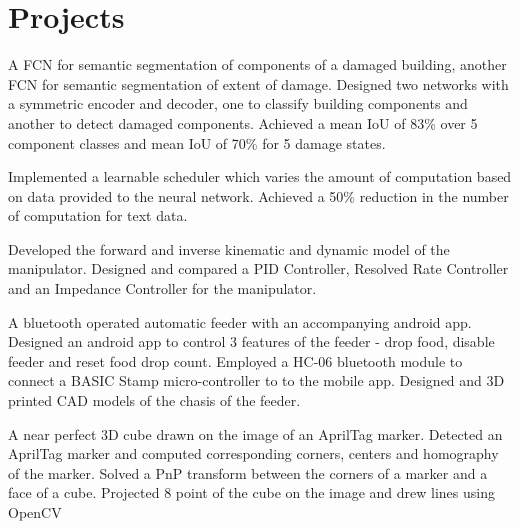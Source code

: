 \section{Projects}
\resumeSubHeadingListStart

\resumeItemListStart
{}
{A FCN for semantic segmentation of components of a damaged building, another FCN for semantic segmentation of extent of damage.}
{Designed two networks with a symmetric encoder and decoder, one to classify building components and another to detect damaged components.}
{Achieved a mean IoU of 83\% over 5 component classes and mean IoU of 70\% for 5 damage states.}
\resumeItemListEnd

\resumeItemListStart
{}
{Implemented a learnable scheduler which varies the amount of computation based on data provided to the neural network.}
{Achieved a 50\% reduction in the number of computation for text data.}
\resumeItemListEnd

\resumeItemListStart
{}
{Developed the forward and inverse kinematic and dynamic model of the manipulator.}
{Designed and compared a PID Controller, Resolved Rate Controller and an Impedance Controller for the manipulator.}
\resumeItemListEnd

\resumeItemListStart
{}
{A bluetooth operated automatic feeder with an accompanying android app.}
{Designed an android app to control 3 features of the feeder - drop food, disable feeder and reset food drop count. }
{Employed a HC-06 bluetooth module to connect a BASIC Stamp micro-controller to to the mobile app.}
{Designed and 3D printed CAD models of the chasis of the feeder.}
\resumeItemListEnd

\resumeItemListStart
{}
{A near perfect 3D cube drawn on the image of an AprilTag marker.}
{Detected an AprilTag marker and computed corresponding corners, centers and homography of the marker.}
{Solved a PnP transform between the corners of a marker and a face of a cube.}
{Projected 8 point of the cube on the image and drew lines using OpenCV}
\resumeItemListEnd

